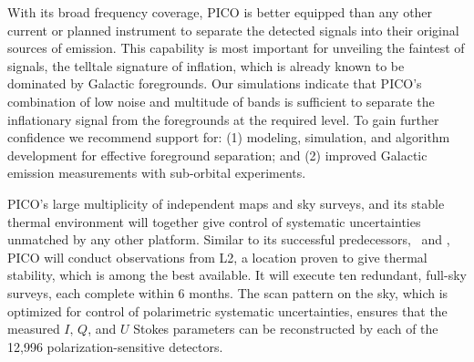 \documentclass[PICOReport.tex]{subfiles}
\begin{document}
With its broad frequency coverage, PICO is better equipped than any other current or planned instrument to separate the detected signals into their original sources of emission.  This capability is most important for unveiling the faintest of signals, the telltale signature of inflation, which is already known to be dominated by Galactic foregrounds. Our simulations indicate that PICO's combination of low noise and multitude of bands is sufficient to separate the inflationary signal from the foregrounds at the required level. To gain further confidence we recommend support for: (1) modeling, simulation, and algorithm development for effective foreground separation; and (2) improved Galactic emission measurements with sub-orbital experiments. 


\afterpage{%
  \switchToLayoutPageB{}
    
   \clearpage
\switchToLayoutPageA{}
}


PICO's large multiplicity of independent maps and sky surveys, and its stable thermal environment will together give control of systematic uncertainties unmatched by any other platform. Similar to its successful predecessors, \wmap\ and \planck , PICO will conduct observations from L2, a location proven to give thermal stability, which is among the best available.  It will execute ten redundant,  full-sky surveys, each complete within 6 months. The scan pattern on the sky, which is optimized for control of polarimetric systematic uncertainties, ensures that the measured $I,\, Q$, and $U$ Stokes parameters can be reconstructed by each of the 12,996 polarization-sensitive detectors. 
\end{document}
